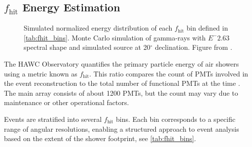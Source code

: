 \subsection{$f_\mathrm{hit}$ Energy Estimation}\label{sec:hawc_fhit}

\begin{figure}
    \caption{Simulated normalized energy distribution of each $f_\mathrm{hit}$ bin defined in \cref{tab:fhit_bins}. Monte Carlo simulation of gamma-rays with $E^-{2.63}$ spectral shape and simulated source at 20$^\circ$ declination. Figure from \cite{Abeysekara_2017}.}
    \label{fig:fhit_bins}
\end{figure}



The HAWC Observatory quantifies the primary particle energy of air showers using a metric known as $f_{\text{hit}}$.
This ratio compares the count of PMTs involved in the event reconstruction to the total number of functional PMTs at the time \cite{Abeysekara_2017}.
The main array consists of about 1200 PMTs, but the count may vary due to maintenance or other operational factors.

Events are stratified into several $f_{\text{hit}}$ bins.
Each bin corresponds to a specific range of angular resolutions, enabling a structured approach to event analysis based on the extent of the shower footprint, see \cref{tab:fhit_bins}.

